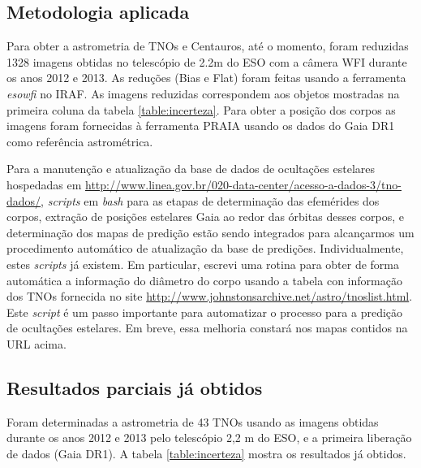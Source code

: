 \documentclass[a4paper, 11pt]{article}
\begin{document}
\subsection{Metodologia aplicada}
Para obter a astrometria de TNOs e Centauros, at\'e o momento, foram reduzidas 1328 imagens obtidas no telesc\'opio de 2.2m do ESO com a c\^amera WFI durante os anos 2012 e 2013. As reduções (Bias e Flat) foram feitas usando a ferramenta \textit{esowfi} no IRAF. As imagens reduzidas correspondem aos objetos mostradas na primeira coluna da tabela \ref{table:incerteza}. Para obter a posição dos corpos as imagens foram fornecidas à ferramenta PRAIA usando os dados do Gaia DR1 como refer\^encia astrom\'etrica. 

Para a manutenção e atualização da base de dados de ocultações estelares hospedadas em \url{http://www.linea.gov.br/020-data-center/acesso-a-dados-3/tno-dados/}, {\it scripts} em {\it bash} para as etapas de determinação das efemérides dos corpos, extração de posições estelares Gaia ao redor das órbitas desses corpos, e determinação dos mapas de predição estão sendo integrados para alcançarmos um procedimento automático de atualização da base de predições. Individualmente, estes {\it scripts} já existem. Em particular, escrevi uma rotina para obter de forma automática a informação do diâmetro do corpo usando a tabela con informação dos TNOs fornecida no site \url{http://www.johnstonsarchive.net/astro/tnoslist.html}. Este \textit{script}  é um passo importante para automatizar o processo para a predição de ocultações estelares. Em breve, essa melhoria constará nos mapas contidos na URL acima.

\subsection{Resultados parciais já obtidos}

Foram determinadas a astrometria de 43 TNOs usando as imagens obtidas durante os anos 2012 e 2013 pelo telescópio 2,2 m do ESO, e a primeira liberação de dados (Gaia DR1). A tabela \ref{table:incerteza} mostra os resultados já obtidos.  
\end{document}
